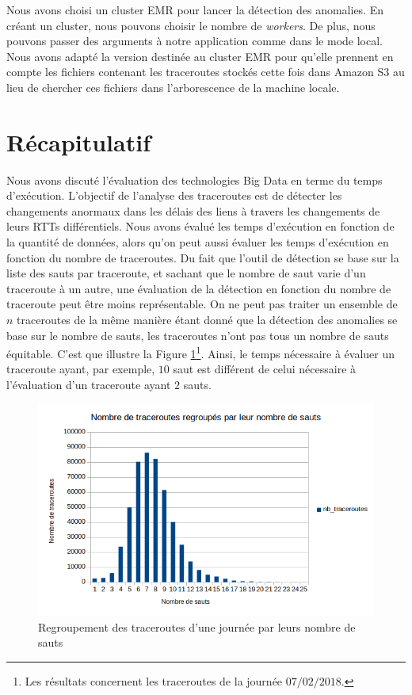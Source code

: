 Nous avons choisi un cluster EMR pour  lancer la détection des anomalies. En créant un cluster, nous pouvons choisir le nombre de \textit{workers}. De plus, nous pouvons passer des arguments à notre application comme dans le mode local. Nous avons adapté la version destinée au cluster EMR pour qu'elle prennent en compte les fichiers contenant les traceroutes stockés cette fois dans Amazon S3 au lieu de chercher ces fichiers dans l'arborescence de la machine locale. 

\section{Récapitulatif}

Nous avons discuté l'évaluation des technologies Big Data en terme du temps d'exécution. L'objectif de l'analyse des traceroutes est de détecter les changements anormaux dans les délais des liens à travers les changements de leurs RTTs différentiels. Nous avons évalué les temps d'exécution en fonction de la quantité de données, alors qu'on peut aussi évaluer les temps d'exécution en fonction du nombre de traceroutes. Du fait que l'outil de détection se base sur la liste des sauts par traceroute, et sachant que le nombre de saut varie d'un traceroute à un autre, une évaluation de la détection en fonction du nombre de traceroute peut être moins représentable. 
On ne peut pas traiter un ensemble de $n$ traceroutes de la même manière étant donné que la détection des anomalies se base sur le nombre de sauts, les traceroutes n'ont pas tous un nombre de sauts équitable. C'est que illustre 
la Figure 	\ref{fig:traceroutes-par-sauts}\footnote{Les résultats concernent les traceroutes de la journée $07/02/2018$.}. Ainsi, le temps nécessaire à évaluer un traceroute ayant, par exemple, $10$ saut est différent de celui nécessaire à l'évaluation d'un traceroute ayant $2$ sauts. 
\begin{figure}[H]
	\centering
	\includegraphics[width=0.8\linewidth]{illustrations/traceroutes-par-sauts}
	\caption{Regroupement des traceroutes d'une journée  par leurs nombre de sauts}
	\label{fig:traceroutes-par-sauts}
\end{figure}

